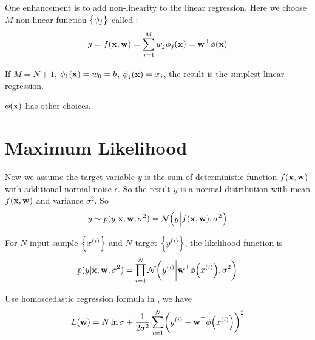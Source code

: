 One enhancement is to add non-linearity to the linear regression. Here we choose $M$ non-linear function $\set{\phi_j}$ called :
\begin{equation}
    y = f(\mathbf{x}, \mathbf{w}) = \sum_{j=1}^M w_j \phi_j (\mathbf{x}) = {\mathbf{w}}^\top \phi(\mathbf{x})
\end{equation}

If $M = N+1$, $\phi_1(\mathbf{x}) = w_0 = b$, $\phi_j(\mathbf{x}) = {x}_{j}$, the result is the simplest linear regression.

$\phi(\mathbf{x})$ has other choices.




\section{Maximum Likelihood}

Now we assume the target variable $y$ is the sum of deterministic function $f(\mathbf{x}, \mathbf{w})$ with additional normal noise $\epsilon$. So the result $y$ is a normal distribution with mean $f(\mathbf{x}, \mathbf{w})$ and variance $\sigma^2$. So
\begin{equation}
    y \sim p(y|\feature{x}, \feature{w}, \sigma^2) = \normaldistributionwithparameter{y}{f(\feature{x}, \feature{w})}{\sigma^2}
\end{equation}

For $N$ input sample $\set{{x}^{(i)}}$ and $N$ target $\set{{y}^{(i)}}$, the likelihood function is
\begin{equation}
    p(y|\feature{x}, \feature{w}, \sigma^2) = \prod_{i=1}^N \normaldistributionwithparameter{\selectonesample{y}{i}}{\transpose{\feature{w}} \phi\mleft(\selectonesample{x}{i}\mright)}{\sigma^2}
\end{equation}

Use homoscedastic regression formula in , we have 
\begin{equation}\label{loss_function_of_linear_regression}
    L(\feature{w}) = N \ln \sigma + \frac{1}{2\sigma^2} \sum_{i=1}^N \mleft( \selectonesample{y}{i} - \transpose{\feature{w}} \phi\mleft(\selectonesample{x}{i}\mright) \mright)^2
\end{equation}

